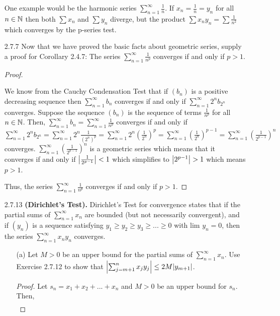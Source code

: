 \documentclass[12pt,letterpaper]{article}
\begin{document}
\begin{itemize}[leftmargin=!,labelindent=5pt]
    One example would be the harmonic series $\sum_{n=1}^{\infty} \frac{1}{n}$.
    If $x_n = \frac{1}{n} = y_n$ for all $n \in \mathbb{N}$ then both $\sum x_n$ and $\sum y_n$ diverge, but the product $\sum x_ny_n = \sum \frac{1}{n^2}$ which converges by the p-series test.
    \item [2.7.7] Now that we have proved the basic facts about geometric series, supply a proof for Corollary 2.4.7: The series $\sum_{n=1}^{\infty} \frac{1}{n^p}$ converges if and only if $p > 1$.
        \begin{proof}
            \begin{spacing}{1.2}
                We know from the Cauchy Condensation Test that if $(b_n)$ is a positive decreasing sequence then $\sum_{n=1}^{\infty}b_n$ converges if and only if $\sum_{n=1}^{\infty}2^n b_{2^n}$ converges.
                Suppose the sequence $(b_n)$ is the sequence of terms $\frac{1}{n^p}$ for all $n\in \mathbb{N}$.
                Then, $\sum_{n=1}^{\infty}b_n = \sum_{n=1}^{\infty} \frac{1}{n^p}$ converges if and only if $\sum_{n=1}^{\infty}2^n b_{2^n} = \sum_{n=1}^{\infty}2^n \frac{1}{(2^n)^p} = 
                \sum_{n=1}^{\infty}2^n (\frac{1}{2^n})^p = \sum_{n=1}^{\infty}(\frac{1}{2^n})^{p-1} = \sum_{n=1}^{\infty}(\frac{1}{2^{p-1}})^n$ converges. 
                $\sum_{n=1}^{\infty}(\frac{1}{2^{p-1}})^n$ is a geometric series which means that it converges if and only if $\abs{\frac{1}{2^{p-1}}} < 1$ which simplifies to $\abs{2^{p-1}} > 1$ which means $p > 1$.
            \end{spacing}
                Thus, the series $\sum_{n=1}^{\infty} \frac{1}{n^p}$ converges if and only if $p > 1$.
        \end{proof}
    \item [2.7.13] \textbf{(Dirichlet’s Test).} Dirichlet’s Test for convergence states that if the partial sums of $\sum_{n=1}^{\infty} x_n$ are bounded (but not necessarily convergent), and if $(y_n)$ is a sequence satisfying $y_1 \geq y_2 \geq y_3 \geq ... \geq 0$ with lim $y_n = 0$, then the series $\sum_{n=1}^{\infty} x_n y_n$ converges.
        \begin{itemize}
            \item [(a)] Let $M > 0$ be an upper bound for the partial sums of $\sum_{n=1}^{\infty}x_n$. Use Exercise 2.7.12 to show that $\abs{\sum_{j=m+1}^{n} x_j y_j} \leq 2M \abs{y_{m+1}}$.
                \begin{proof}
                    Let $s_n = x_1 + x_2 + ... + x_n$ and $M > 0$ be an upper bound for $s_n$. Then,
                    \begin{align*}

\end{align*}
\end{proof}
\end{itemize}
\end{itemize}
\end{document}
